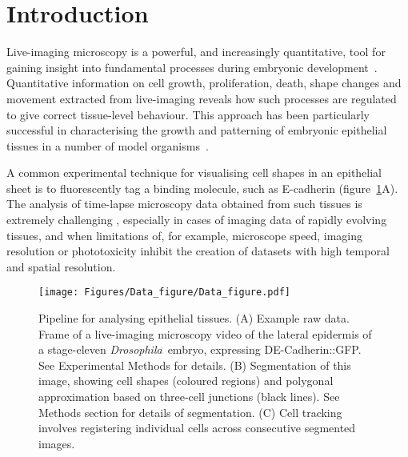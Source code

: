 \documentclass[a4paper,11pt]{article}
\newcommand{\Drosophila}{\textit{Drosophila}~}
\begin{document}

\clearpage

\section{Introduction}

Live-imaging microscopy is a powerful, and increasingly quantitative, tool for gaining insight into fundamental processes during embryonic development~\cite{Stephens2003, Pantazis2014, Truong2011}. Quantitative information on cell growth, proliferation, death, shape changes and movement extracted from live-imaging reveals how such processes are regulated to give correct tissue-level behaviour. This approach has been particularly successful in characterising the growth and patterning of embryonic epithelial tissues in a number of model organisms~\cite{Mao2011, Gibson2006, Rauzi2008, Collinet2015, Ritsma2014,Parker2006}. 

A common experimental technique for visualising cell shapes in an epithelial sheet is to fluorescently tag a binding molecule, such as E-cadherin (figure~\ref{fig:data}A). 
The analysis of time-lapse microscopy data obtained from such tissues is extremely challenging \cite{Pantazis2014, Truong2011}, especially in cases of imaging data of rapidly evolving tissues, and when limitations of, for example, microscope speed, imaging resolution or phototoxicity inhibit the creation of datasets with high temporal and spatial resolution.


\begin{figure}[h]
\centering
\texttt{[image: Figures/Data\_figure/Data\_figure.pdf]}
\caption{Pipeline for analysing epithelial tissues. 
(A) Example raw data. 
Frame of a live-imaging microscopy video of the lateral epidermis of a stage-eleven \Drosophila embryo, expressing DE-Cadherin::GFP. 
See Experimental Methods for details. 
(B) Segmentation of this image, showing cell shapes (coloured regions) and polygonal approximation based on three-cell junctions (black lines). See Methods section for details of segmentation. 
(C) Cell tracking involves registering individual cells across consecutive segmented images.} 
\label{fig:data}
\end{figure}

\end{document}
